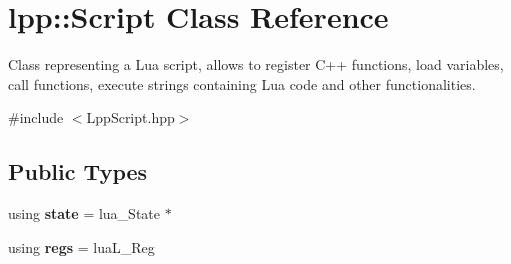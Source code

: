 \hypertarget{classlpp_1_1_script}{}\section{lpp\+:\+:Script Class Reference}
\label{classlpp_1_1_script}


Class representing a Lua script, allows to register C++ functions, load variables, call functions, execute strings containing Lua code and other functionalities.  




{\ttfamily \#include $<$Lpp\+Script.\+hpp$>$}

\subsection*{Public Types}
\begin{DoxyCompactItemize}
\item 
using {\bfseries state} = lua\+\_\+\+State $\ast$\hypertarget{classlpp_1_1_script_a13f260b1d630839b13881333bcd44188}{}\label{classlpp_1_1_script_a13f260b1d630839b13881333bcd44188}

\item 
using {\bfseries regs} = lua\+L\+\_\+\+Reg\hypertarget{classlpp_1_1_script_a090601b6d3da1285189245966234046c}{}\label{classlpp_1_1_script_a090601b6d3da1285189245966234046c}

\end{DoxyCompactItemize}
